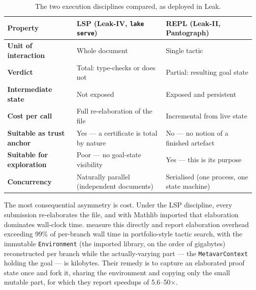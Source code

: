 \documentclass[12pt, a4paper]{article}
\begin{document}
\begin{table}[H]
  \centering
  \caption{The two execution disciplines compared, as deployed in Leak.}
  \label{tab:lsp-vs-repl}
  \renewcommand{\arraystretch}{1.4}
  \begin{tabular}{>{\bfseries}p{3.0cm} p{5.6cm} p{5.6cm}}
    \toprule
    Property & LSP (Leak-IV, \texttt{lake serve}) & REPL (Leak-II, Pantograph) \\
    \midrule
    Unit of interaction & Whole document & Single tactic \\
    Verdict & Total: type-checks or does not & Partial: resulting goal state \\
    Intermediate state & Not exposed & Exposed and persistent \\
    Cost per call & Full re-elaboration of the file & Incremental from live state \\
    Suitable as trust anchor & Yes --- a certificate is total by nature & No --- no notion of a finished artefact \\
    Suitable for exploration & Poor --- no goal-state visibility & Yes --- this is its purpose \\
    Concurrency & Naturally parallel (independent documents) & Serialised (one process, one state machine) \\
    \bottomrule
  \end{tabular}
\end{table}

The most consequential asymmetry is cost. Under the LSP discipline, every
submission re-elaborates the file, and with Mathlib imported that
elaboration dominates wall-clock time.
\textcite{shen2026snapshot} measure this directly and report elaboration
overhead exceeding 99\% of per-branch wall time in portfolio-style tactic
search, with the immutable \texttt{Environment} (the imported library, on
the order of gigabytes) reconstructed per branch while the actually-varying
part --- the \texttt{MetavarContext} holding the goal --- is kilobytes. Their
remedy is to capture an elaborated proof state once and fork it, sharing the
environment and copying only the small mutable part, for which they report
speedups of 5.6--50$\times$.
\end{document}
